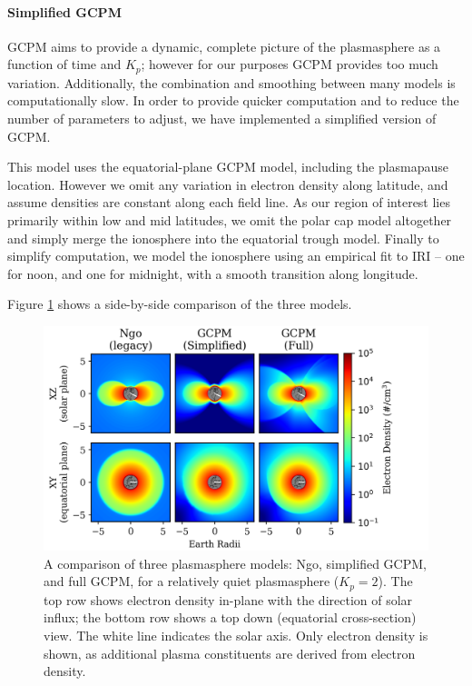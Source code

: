 \paragraph{Simplified GCPM}

GCPM aims to provide a dynamic, complete picture of the plasmasphere as a function of time and $K_p$; however for our purposes GCPM provides too much variation. Additionally, the combination and smoothing between many models is computationally slow. In order to provide quicker computation and to reduce the number of parameters to adjust, we have implemented a simplified version of GCPM.

This model uses the equatorial-plane GCPM model, including the plasmapause location. However we omit any variation in electron density along latitude, and assume densities are constant along each field line. As our region of interest lies primarily within low and mid latitudes, we omit the polar cap model altogether and simply merge the ionosphere into the equatorial trough model. Finally to simplify computation, we model the ionosphere using an empirical fit to IRI -- one for noon, and one for midnight, with a smooth transition along longitude.

Figure \ref{fig:plasma_model_comparison} shows a side-by-side comparison of the three models.
\begin{figure}[h]
\begin{center}
\includegraphics{figures/plasma_model_comparison_serif.png}
\caption[A Comparison of three plasmasphere electron density models]{A comparison of three plasmasphere models: Ngo, simplified GCPM, and full GCPM, for a relatively quiet plasmasphere ($K_p=2$). The top row shows electron density in-plane with the direction of solar influx; the bottom row shows a top down (equatorial cross-section) view. The white line indicates the solar axis. Only electron density is shown, as additional plasma constituents are derived from electron density.}
\label{fig:plasma_model_comparison}
\end{center}
\end{figure}

